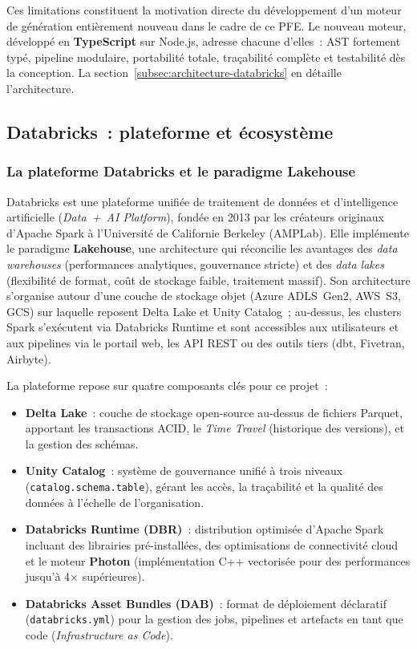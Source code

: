 Ces limitations constituent la motivation directe du développement d'un moteur de génération entièrement nouveau dans le cadre de ce PFE. Le nouveau moteur, développé en \textbf{TypeScript} sur Node.js, adresse chacune d'elles~: AST fortement typé, pipeline modulaire, portabilité totale, traçabilité complète et testabilité dès la conception. La section~\ref{subsec:architecture-databricks} en détaille l'architecture.

\subsection{Databricks~: plateforme et écosystème}
\label{subsec:databricks-plateforme}

\subsubsection*{La plateforme Databricks et le paradigme Lakehouse}

Databricks est une plateforme unifiée de traitement de données et d'intelligence artificielle (\textit{Data~+~AI Platform}), fondée en 2013 par les créateurs originaux d'Apache Spark à l'Université de Californie Berkeley (AMPLab). Elle implémente le paradigme \textbf{Lakehouse}, une architecture qui réconcilie les avantages des \textit{data warehouses} (performances analytiques, gouvernance stricte) et des \textit{data lakes} (flexibilité de format, coût de stockage faible, traitement massif). Son architecture s'organise autour d'une couche de stockage objet (Azure ADLS~Gen2, AWS~S3, GCS) sur laquelle reposent Delta Lake et Unity Catalog~; au-dessus, les clusters Spark s'exécutent via Databricks Runtime et sont accessibles aux utilisateurs et aux pipelines via le portail web, les API REST ou des outils tiers (dbt, Fivetran, Airbyte).

La plateforme repose sur quatre composants clés pour ce projet~:
\begin{itemize}[leftmargin=*]
  \item \textbf{Delta Lake}~: couche de stockage open-source au-dessus de fichiers Parquet, apportant les transactions ACID, le \textit{Time Travel} (historique des versions), et la gestion des schémas.
  \item \textbf{Unity Catalog}~: système de gouvernance unifié à trois niveaux (\texttt{catalog.schema.table}), gérant les accès, la traçabilité et la qualité des données à l'échelle de l'organisation.
  \item \textbf{Databricks Runtime (DBR)}~: distribution optimisée d'Apache Spark incluant des librairies pré-installées, des optimisations de connectivité cloud et le moteur \textbf{Photon} (implémentation C++ vectorisée pour des performances jusqu'à 4× supérieures).
  \item \textbf{Databricks Asset Bundles (DAB)}~: format de déploiement déclaratif (\texttt{databricks.yml}) pour la gestion des jobs, pipelines et artefacts en tant que code (\textit{Infrastructure as Code}).
\end{itemize}

